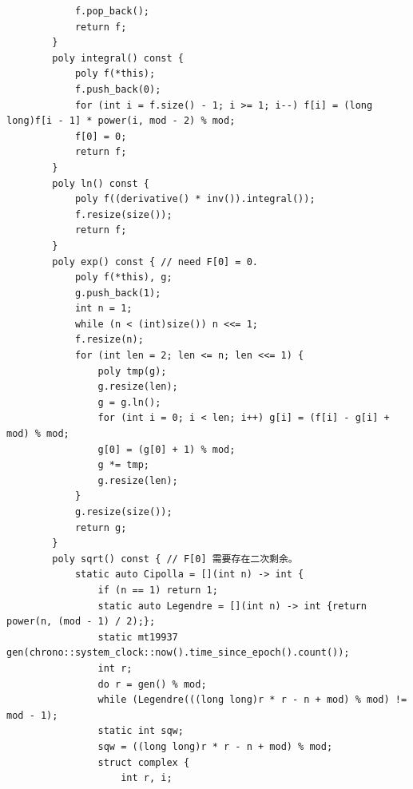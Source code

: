 \begin{verbatim}
            f.pop_back();
            return f;
        }
        poly integral() const {
            poly f(*this);
            f.push_back(0);
            for (int i = f.size() - 1; i >= 1; i--) f[i] = (long long)f[i - 1] * power(i, mod - 2) % mod;
            f[0] = 0;
            return f;
        }
        poly ln() const {
            poly f((derivative() * inv()).integral());
            f.resize(size()); 
            return f;
        }
        poly exp() const { // need F[0] = 0.
            poly f(*this), g;
            g.push_back(1);
            int n = 1;
            while (n < (int)size()) n <<= 1;
            f.resize(n);
            for (int len = 2; len <= n; len <<= 1) {
                poly tmp(g);
                g.resize(len);
                g = g.ln();
                for (int i = 0; i < len; i++) g[i] = (f[i] - g[i] + mod) % mod;
                g[0] = (g[0] + 1) % mod;
                g *= tmp;
                g.resize(len);
            }
            g.resize(size());
            return g;
        }
        poly sqrt() const { // F[0] 需要存在二次剩余。
            static auto Cipolla = [](int n) -> int {
                if (n == 1) return 1;
                static auto Legendre = [](int n) -> int {return power(n, (mod - 1) / 2);};
                static mt19937 gen(chrono::system_clock::now().time_since_epoch().count());
                int r;
                do r = gen() % mod;
                while (Legendre(((long long)r * r - n + mod) % mod) != mod - 1);
                static int sqw;
                sqw = ((long long)r * r - n + mod) % mod;
                struct complex {
                    int r, i;
        

\end{verbatim}
